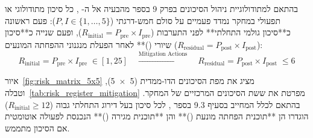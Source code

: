 בהתאם למתודולוגיית ניהול הסיכונים בפרק \num{9} בספר מהבעיה אל ה- \cite{segal2026prep,iso31000}, כל סיכון מתודולוגי או תפעולי במחקר נמדד פעמיים על סולם חמש-דרגתי ($P, I \in \{1,\dots,5\}$): פעם ראשונה כ**סיכון גולמי התחלתי** לפני התערבות ($R_{\text{initial}} = P_{\text{pre}} \times I_{\text{pre}}$), ופעם שנייה כ**סיכון שיורי ()** לאחר הפעלת מנגנוני ההפחתה המונעים ($R_{\text{residual}} = P_{\text{post}} \times I_{\text{post}}$):
\begin{equation}
\label{eq:risk_quantification}
R_{\text{initial}} = P_{\text{pre}} \times I_{\text{pre}} \;\in [1, 25] \quad \xrightarrow{\text{Mitigation Actions}} \quad R_{\text{residual}} = P_{\text{post}} \times I_{\text{post}} \;\le 6
\end{equation}

איור~\ref{fig:risk_matrix_5x5} מציג את מפת הסיכונים הדו-ממדית (\num{5x5}), וטבלה~\ref{tab:risk_register_mitigation} מפרטת את ששת הסיכונים המרכזיים של המחקר. בהתאם לכלל המחייב בסעיף \num{9.3} בספר \cite{segal2026prep}, לכל סיכון בעל דירוג התחלתי גבוה ($R_{\text{initial}} \ge 12$) הוגדרו הן **תוכנית הפחתה מונעת ()** והן **תוכנית מגירה ()** הנכנסת לפעולה אוטומטית אם הסיכון מתממש.

